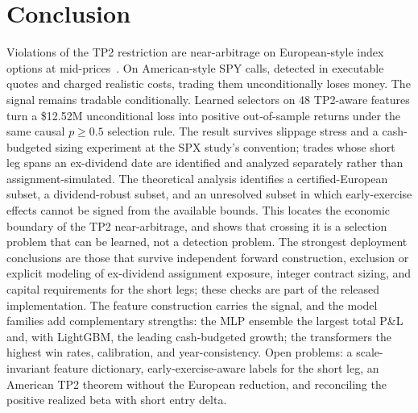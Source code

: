 \documentclass[sigconf,review,anonymous]{acmart}
\begin{document}
\section{Conclusion}
Violations of the TP2 restriction are near-arbitrage on European-style index options at mid-prices~\cite{glasserman2025tp2,glasserman2026tp2theory}. On American-style SPY calls, detected in executable quotes and charged realistic costs, trading them unconditionally loses money. The signal remains tradable conditionally. Learned selectors on 48 TP2-aware features turn a \$12.52M unconditional loss into positive out-of-sample returns under the same causal $p\ge0.5$ selection rule. The result survives slippage stress and a cash-budgeted sizing experiment at the SPX study's convention; trades whose short leg spans an ex-dividend date are identified and analyzed separately rather than assignment-simulated. The theoretical analysis identifies a certified-European subset, a dividend-robust subset, and an unresolved subset in which early-exercise effects cannot be signed from the available bounds. This locates the economic boundary of the TP2 near-arbitrage, and shows that crossing it is a selection problem that can be learned, not a detection problem. The strongest deployment conclusions are those that survive independent forward construction, exclusion or explicit modeling of ex-dividend assignment exposure, integer contract sizing, and capital requirements for the short legs; these checks are part of the released implementation. The feature construction carries the signal, and the model families add complementary strengths: the MLP ensemble the largest total P\&L and, with LightGBM, the leading cash-budgeted growth; the transformers the highest win rates, calibration, and year-consistency. Open problems: a scale-invariant feature dictionary, early-exercise-aware labels for the short leg, an American TP2 theorem without the European reduction, and reconciling the positive realized beta with short entry delta.
\end{document}
